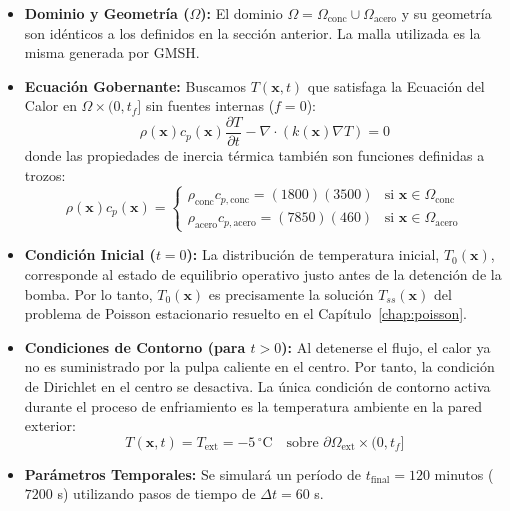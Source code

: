 \begin{itemize}
    \item \textbf{Dominio y Geometría (\(\Omega\)):} El dominio \(\Omega = \Omega_{\text{conc}} \cup \Omega_{\text{acero}}\) y su geometría son idénticos a los definidos en la sección anterior. La malla utilizada es la misma generada por GMSH.
    
    \item \textbf{Ecuación Gobernante:} Buscamos \(T(\bm{x}, t)\) que satisfaga la Ecuación del Calor en \(\Omega \times (0, t_f]\) sin fuentes internas (\(f=0\)):
    \[ \rho(\bm{x}) c_p(\bm{x}) \frac{\partial T}{\partial t} - \nabla \cdot (k(\bm{x}) \nabla T) = 0 \]
    donde las propiedades de inercia térmica también son funciones definidas a trozos:
    \[
    \rho(\bm{x})c_p(\bm{x}) = 
    \begin{cases} 
    \rho_{\text{conc}} c_{p, \text{conc}} = (1800)(3500) & \text{si } \bm{x} \in \Omega_{\text{conc}} \\
    \rho_{\text{acero}} c_{p, \text{acero}} = (7850)(460)  & \text{si } \bm{x} \in \Omega_{\text{acero}} 
    \end{cases}
    \]
    
    \item \textbf{Condición Inicial (\(t=0\)):} La distribución de temperatura inicial, \(T_0(\bm{x})\), corresponde al estado de equilibrio operativo justo antes de la detención de la bomba. Por lo tanto, \(T_0(\bm{x})\) es precisamente la solución \(T_{ss}(\bm{x})\) del problema de Poisson estacionario resuelto en el Capítulo~\ref{chap:poisson}.
    
    \item \textbf{Condiciones de Contorno (para \(t > 0\)):} Al detenerse el flujo, el calor ya no es suministrado por la pulpa caliente en el centro. Por tanto, la condición de Dirichlet en el centro se desactiva. La única condición de contorno activa durante el proceso de enfriamiento es la temperatura ambiente en la pared exterior:
    \[ T(\bm{x}, t) = T_{\text{ext}} = -5 \, ^\circ\text{C} \quad \text{sobre } \partial\Omega_{\text{ext}} \times (0, t_f] \]
    
    \item \textbf{Parámetros Temporales:} Se simulará un período de \(t_{\text{final}} = 120\) minutos (\(7200\) s) utilizando pasos de tiempo de \(\Delta t = 60\) s.
\end{itemize}

